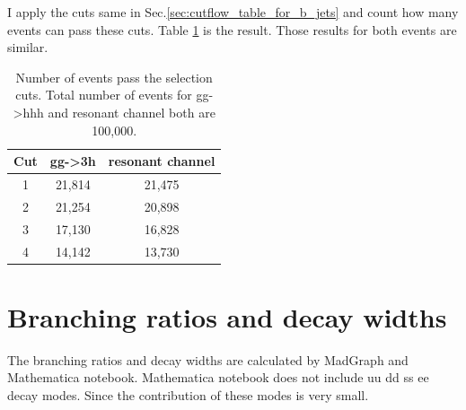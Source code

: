 \documentclass[12pt]{article}
\begin{document}
	I apply the cuts same in Sec.\ref{sec:cutflow_table_for_b_jets} and count how many events can pass these cuts. Table \ref{tab:cutflow_table_signal_and_resonant_bjet} is the result. Those results for both events are similar.
	\begin{table}[htpb]
		\centering
		\caption{Number of events pass the selection cuts. Total number of events for gg->hhh and resonant channel both are 100,000.}
		\label{tab:cutflow_table_signal_and_resonant_bjet}
		\begin{tabular}{ccc}
			Cut &  gg->3h & resonant channel \\
			\hline
			1 & 21,814 & 21,475\\
			2 & 21,254 & 20,898\\
			3 & 17,130 & 16,828\\
			4 & 14,142 & 13,730
		\end{tabular}	
	\end{table}

\section{Branching ratios and decay widths}%
\label{sec:branching_ratios_and_decay_widths}
	The branching ratios and decay widths are calculated by MadGraph and Mathematica notebook. Mathematica notebook does not include uu dd ss ee decay modes. Since the contribution of these modes is very small. 
\end{document}
